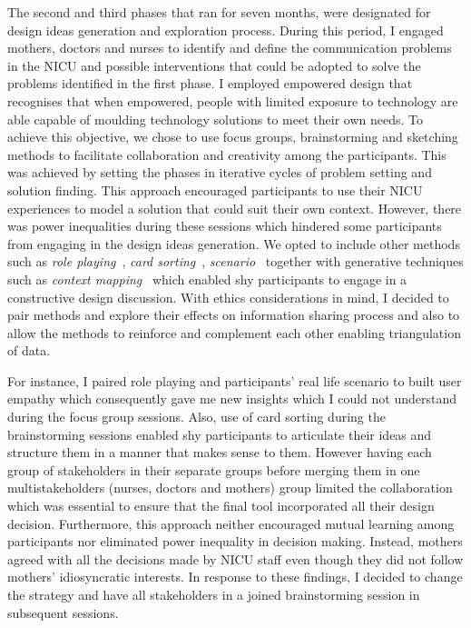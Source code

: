 The second and third phases that ran for seven months, were designated for design ideas generation and exploration process. During this period, I engaged mothers, doctors and nurses to identify and define the communication problems in the NICU and possible interventions that could be adopted to solve the problems identified in the first phase. I employed \textcite{Marsden2008} empowered design  that recognises that when empowered, people with limited exposure to technology are able capable of moulding technology solutions to meet their own needs. To achieve this objective, we chose to use focus groups, brainstorming and sketching methods to facilitate collaboration and creativity among the participants. This was achieved by setting the phases in iterative cycles of problem setting and solution finding. This approach encouraged participants to use their NICU experiences to model a solution that could suit their own context. However, there was power inequalities during these sessions which hindered some participants from engaging in the design ideas generation. We opted to include other methods such as \textit{role playing}~\citep{Lawson2016}, \textit{card sorting}~\citep{Nakarada-Kordic2017}, \textit{scenario}~\citep{Nardi2007} together with generative techniques such as \textit{context mapping}~\citep{Offermans2014} which enabled shy participants to engage in a constructive design discussion. With ethics considerations in mind, I decided to pair methods and explore their effects on information sharing process and also to allow the methods to reinforce and complement each other enabling triangulation of data. 

For instance, I paired role playing and participants' real life scenario to built user empathy which consequently gave me new insights which I could not understand during the focus group sessions. Also, use of card sorting during the brainstorming sessions enabled shy participants to articulate their ideas and structure them in a manner that makes sense to them. However having each group of stakeholders in their separate groups before merging them in one multistakeholders (nurses, doctors and mothers) group limited the collaboration which was essential to ensure that the final tool incorporated all their design decision. Furthermore, this approach neither encouraged mutual learning among participants nor eliminated power inequality in decision making. Instead, mothers agreed with all the decisions made by NICU staff even though they did not follow mothers' idiosyncratic interests. In response to these findings, I decided to change the strategy and have all stakeholders in a joined brainstorming session in subsequent sessions.

